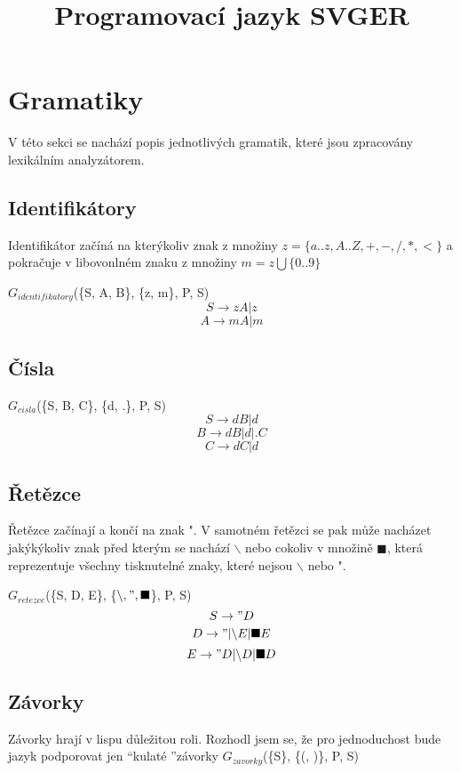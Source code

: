 \documentclass[a4paper,11pt]{article}
\title{Programovací jazyk SVGER}
\begin{document}
\maketitle

\newpage
\tableofcontents

\newpage
\section{Gramatiky}
V této sekci se nachází popis jednotlivých gramatik, které jsou zpracovány lexikálním analyzátorem.

\subsection{Identifikátory}
Identifikátor začíná na kterýkoliv znak z množiny $z = \{a..z, A..Z, +, -, /, *, <\}$
a pokračuje v libovonlném znaku z množiny $m = z \bigcup \{0..9\}$ 
\linebreak

$G_{identifikatory}$(\{S, A, B\}, \{z, m\}, P, S)
$$S \rightarrow zA | z$$
$$A \rightarrow mA | m$$

\subsection{Čísla}
$G_{cisla}$(\{S, B, C\}, \{d, .\}, P, S)
$$S \rightarrow dB | d$$
$$B \rightarrow dB | d | .C$$
$$C \rightarrow dC | d$$



\subsection{Řetězce}
Řetězce začínají a končí na znak ". V samotném řetězci se pak může nacházet jakýkýkoliv znak před kterým se nachází $\backslash$ nebo cokoliv v množině $\blacksquare$, která reprezentuje všechny tisknutelné znaky, které nejsou $\backslash$ nebo ".

$G_{retezce}$(\{S, D, E\}, \{$\backslash, ", \blacksquare$\}, P, S)
$$S \rightarrow "D$$
$$D \rightarrow " | \backslash E | \blacksquare E$$
$$E \rightarrow "D | \backslash D | \blacksquare D$$

\subsection{Závorky}
Závorky hrají v lispu důležitou roli. Rozhodl jsem se, že pro jednoduchost bude jazyk podporovat jen \textquotedblleft kulaté \textquotedblright závorky
$G_{zavorky}$(\{S\}, \{(, )\}, P, S)
\end{document}
